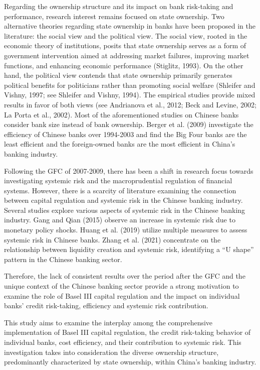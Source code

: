 \documentclass[
  12pt,
  a4paper,
]{scrreprt}
\begin{document}
{{{{Regarding the ownership structure and its impact on bank risk-taking and
performance, research interest remains focused on state ownership. Two
alternative theories regarding state ownership in banks have been
proposed in the literature: the social view and the political view. The
social view, rooted in the economic theory of institutions, posits that
state ownership serves as a form of government intervention aimed at
addressing market failures, improving market functions, and enhancing
economic performance (Stiglitz, 1993). On the other hand, the political
view contends that state ownership primarily generates political
benefits for politicians rather than promoting social welfare (Shleifer
and Vishny, 1997; see Shleifer and Vishny, 1994). The empirical studies
provide mixed results in favor of both views (see Andrianova et al.,
2012; Beck and Levine, 2002; La Porta et al., 2002). Most of the
aforementioned studies on Chinese banks consider bank size instead of
bank ownership. Berger et al. (2009) investigate the efficiency of
Chinese banks over 1994-2003 and find the Big Four banks are the least
efficient and the foreign-owned banks are the most efficient in China's
banking industry.

Following the GFC of 2007-2009, there has been a shift in research focus
towards investigating systemic risk and the macroprudential regulation
of financial systems. However, there is a scarcity of literature
examining the connection between capital regulation and systemic risk in
the Chinese banking industry. Several studies explore various aspects of
systemic risk in the Chinese banking industry. Gang and Qian (2015)
observe an increase in systemic risk due to monetary policy shocks.
Huang et al. (2019) utilize multiple measures to assess systemic risk in
Chinese banks. Zhang et al. (2021) concentrate on the relationship
between liquidity creation and systemic risk, identifying a ``U shape''
pattern in the Chinese banking sector.

Therefore, the lack of consistent results over the period after the GFC
and the unique context of the Chinese banking sector provide a strong
motivation to examine the role of Basel III capital regulation and the
impact on individual banks' credit risk-taking, efficiency and systemic
risk contribution.

This study aims to examine the interplay among the comprehensive
implementation of Basel III capital regulation, the credit risk-taking
behavior of individual banks, cost efficiency, and their contribution to
systemic risk. This investigation takes into consideration the diverse
ownership structure, predominantly characterized by state ownership,
within China's banking industry.

}}}}
\end{document}
